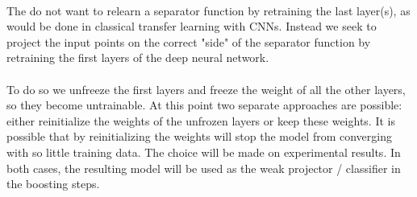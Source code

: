 \documentclass[11 pt]{article}
\begin{document}
\paragraph{}The do not want to relearn a separator function by retraining the last layer(s), as would be done in classical transfer learning with CNNs. Instead we seek to project the input points on the correct "side" of the separator function by retraining the first layers of the deep neural network. 

\paragraph{} To do so we unfreeze the first layers and freeze the weight of all the other layers, so they become untrainable. At this point two separate approaches are possible: either reinitialize the weights of the unfrozen layers or keep these weights. It is possible that by reinitializing the weights will stop the model from converging with so little training data. The choice will be made on experimental results. In both cases, the resulting model will be used as the weak projector / classifier in the boosting steps. \\
\end{document}
